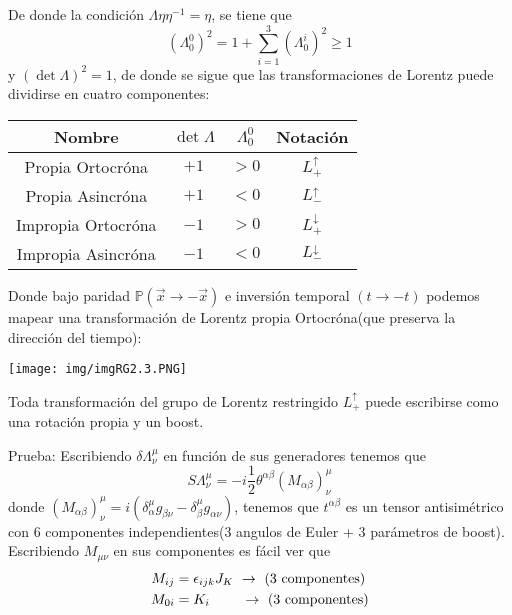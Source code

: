 \documentclass[../main]{subfiles}
\begin{document}
\begin{adjustwidth}{0pt}{-100pt}
De donde la condición $\Lambda \eta \eta^{-1}=\eta$, se tiene que 
\begin{equation}
    (\Lambda^0_0)^2=1+\sum_{i=1}^3 (\Lambda^{i}_0)^2 \geq 1
\end{equation}
y $(\det \Lambda)^2=1$, de donde se sigue que las transformaciones de Lorentz puede dividirse en cuatro componentes:

\begin{table}[H]
    \begin{adjustwidth}{0pt}{-100pt}
    \begin{center}
        \begin{tabular}{|c|c|c|c|}
            \hline
            Nombre & $\det \Lambda$ & $\Lambda^0_0$ & Notación \\ \hline
            Propia Ortocróna & $+1$ & $> 0$ & $L^{\uparrow}_{+}$ \\ \hline
            Propia Asincróna & $+1$ & $< 0$ & $L^{\uparrow}_{-}$ \\ \hline
            Impropia Ortocróna & $-1$ & $> 0$ & $L^{\downarrow}_{+}$ \\ \hline
            Impropia Asincróna & $-1$ & $< 0$ & $L^{\downarrow}_{-}$ \\ \hline
        \end{tabular}    
    \end{center}
    \end{adjustwidth}
\end{table}

Donde bajo paridad $\mathbb{P} (\vec{x}\rightarrow -\vec{x})$ e inversión temporal $(t\rightarrow -t)$ podemos mapear una transformación de Lorentz propia Ortocróna(que preserva la dirección del tiempo):
\begin{center}
    \texttt{[image: img/imgRG2.3.PNG]}
\end{center}

\teorema{} Toda transformación del grupo de Lorentz restringido $L^{\uparrow}_{+}$ puede escribirse como una rotación propia y un boost.

Prueba: Escribiendo $\delta \Lambda^{\mu}_{\nu}$ en función de sus generadores tenemos que
\begin{equation}
    S\Lambda^{\mu}_{\nu}=-i\dfrac{1}{2}\theta^{\alpha\beta}(M_{\alpha\beta})^{\mu}_{\nu}
\end{equation}
donde $(M_{\alpha\beta})^{\mu}_{\nu}=i(\delta^{\mu}_{\alpha}g_{\beta\nu}-\delta^{\mu}_{\beta}g_{\alpha\nu})$, tenemos que $t^{\alpha\beta}$ es un tensor antisimétrico con $6$ componentes independientes($3$ angulos de Euler + $3$ parámetros de boost). Escribiendo $M_{\mu\nu}$ en sus componentes es fácil ver que 
\begin{align*}
    M_{ij}&=\epsilon_{ijk} J_K  \ \rightarrow \  (3 \ \text{componentes})\\
    M_{0i}&=K_i \hspace{0.8cm} \rightarrow \  (3 \ \text{componentes})
\end{align*}


\end{adjustwidth}
\end{document}
